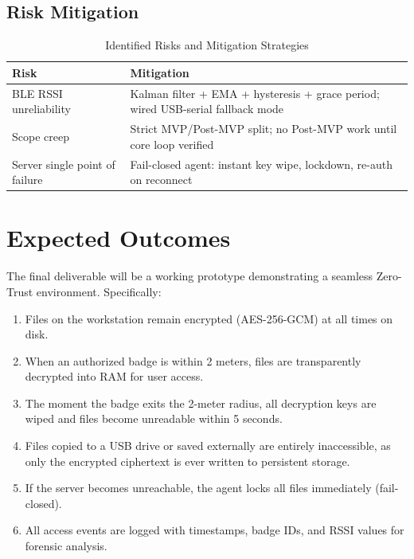 \documentclass[conference]{IEEEtran}
\begin{document}
\subsection{Risk Mitigation}
\begin{table}[htbp]
    \centering
    \caption{Identified Risks and Mitigation Strategies}
    \label{tab:risks}
    \begin{tabularx}{\columnwidth}{l X}
        \toprule
        \textbf{Risk} & \textbf{Mitigation} \\
        \midrule
        BLE RSSI unreliability & Kalman filter + EMA + hysteresis + grace period; wired USB-serial fallback mode \\
        Scope creep & Strict MVP/Post-MVP split; no Post-MVP work until core loop verified \\
        Server single point of failure & Fail-closed agent: instant key wipe, lockdown, re-auth on reconnect \\
        \bottomrule
    \end{tabularx}
\end{table}

\section{Expected Outcomes}

The final deliverable will be a working prototype demonstrating a seamless Zero-Trust environment. Specifically:

\begin{enumerate}[noitemsep]
    \item Files on the workstation remain encrypted (AES-256-GCM) at all times on disk.
    \item When an authorized badge is within 2 meters, files are transparently decrypted into RAM for user access.
    \item The moment the badge exits the 2-meter radius, all decryption keys are wiped and files become unreadable within 5 seconds.
    \item Files copied to a USB drive or saved externally are entirely inaccessible, as only the encrypted ciphertext is ever written to persistent storage.
    \item If the server becomes unreachable, the agent locks all files immediately (fail-closed).
    \item All access events are logged with timestamps, badge IDs, and RSSI values for forensic analysis.
\end{enumerate}
\end{document}
